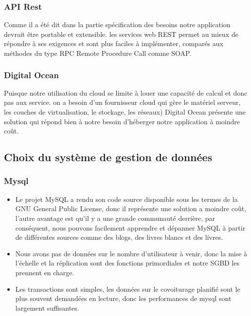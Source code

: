 \subsubsection{API Rest} %
\label{ssub:api_rest}
Comme il a été dit dans la partie spécification des besoins notre application devrait être portable et extensible. les services web REST permet au mieux de répondre à ses exigences et sont plus faciles à implémenter, comparés aux méthodes du type RPC Remote Procedure Call comme SOAP.
\subsubsection{Digital Ocean} %
\label{ssub:digital_ocean}
Puisque notre utilisation du cloud se limite à louer une capacité de calcul et donc pas aux service. on a besoin d'un fournisseur cloud qui gère le matériel serveur, les couches de virtualisation, le stockage, les réseaux)\newline
Digital Ocean  présente une solution qui répond bien à notre besoin d'héberger notre application à moindre coût.\cite{digitalocean}

\subsection{Choix du système de gestion de données} %
\label{sub:partie_base_de_données}
\subsubsection{Mysql} %
\label{ssub:le_choix_de_mysql}
\begin{itemize}
	\item Le projet MySQL a rendu son code source disponible sous les termes de la GNU General Public License, donc il représente une solution a moindre coût, l'autre avantage est qu'il y a une grande communauté derrière, par conséquent, nous pouvons facilement apprendre et dépanner MySQL à partir de différentes sources comme des blogs, des livres blancs et des livres.
	\item Nous avons pas de données sur le nombre d'utilisateur à venir, donc la mise à l'échelle et la réplication sont des fonctions primordiales et notre SGBD les prennent  en charge.
	\item Les transactions sont simples, les données sur le covoiturage planifié sont le plus souvent demandées en lecture, donc les performances de mysql sont largement suffisantes.
\end{itemize}

